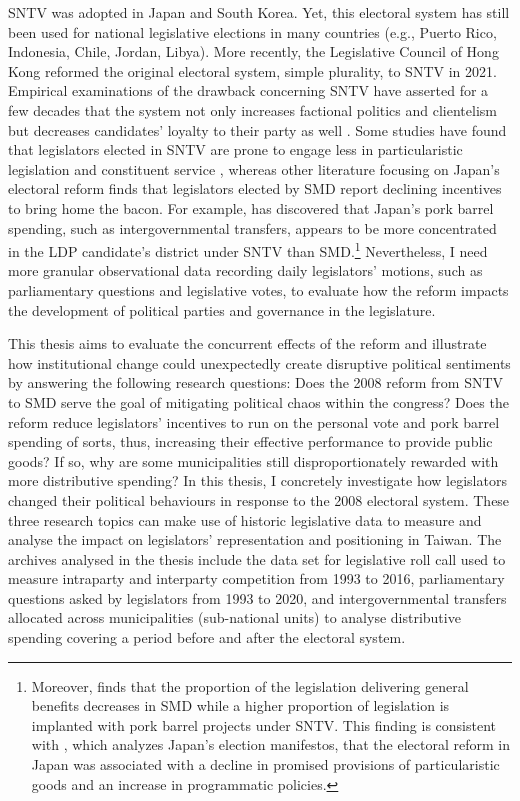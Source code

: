 SNTV was adopted in Japan and South Korea. Yet, this electoral system has still been used for national legislative elections in many countries (e.g., Puerto Rico, Indonesia, Chile, Jordan, Libya). More recently, the Legislative Council of Hong Kong reformed the original electoral system, simple plurality, to SNTV in 2021. Empirical examinations of the drawback concerning SNTV have asserted for a few decades that the system not only increases factional politics and clientelism \citep[e.g.][]{Chang2007, Wu2003} but decreases candidates' loyalty to their party as well \citep[][]{Reed2003, Herron2018, Hsu2004, Nathan1993}. Some studies have found that legislators elected in SNTV are prone to engage less in particularistic legislation \citep[e.g.,][]{Lancaster1986, Crisp2004b, Kerevel2015, Rogowski2017} and constituent service \citep[e.g.,][]{Heitshusen2005}, whereas other literature focusing on Japan's electoral reform finds that legislators elected by SMD report declining incentives to bring home the bacon. For example, \citet{Hirano2006} has discovered that Japan's pork barrel spending, such as intergovernmental transfers, appears to be more concentrated in the LDP candidate's district under SNTV than SMD.\footnote{Moreover, \citet[][]{Sheng2014} finds that the proportion of the legislation delivering general benefits decreases in SMD while a higher proportion of legislation is implanted with pork barrel projects under SNTV. This finding is consistent with \citet{Catalinac2016}, which analyzes Japan's election manifestos, that the electoral reform in Japan was associated with a decline in promised provisions of particularistic goods and an increase in programmatic policies.} Nevertheless, I need more granular observational data recording daily legislators' motions, such as parliamentary questions and legislative votes, to evaluate how the reform impacts the development of political parties and governance in the legislature. 

This thesis aims to evaluate the concurrent effects of the reform and illustrate how institutional change could unexpectedly create disruptive political sentiments by answering the following research questions: Does the 2008 reform from SNTV to SMD serve the goal of mitigating political chaos within the congress? Does the reform reduce legislators' incentives to run on the personal vote and pork barrel spending of sorts, thus, increasing their effective performance to provide public goods? If so, why are some municipalities still disproportionately rewarded with more distributive spending? In this thesis, I concretely investigate how legislators changed their political behaviours in response to the 2008 electoral system. These three research topics can make use of historic legislative data to measure and analyse the impact on legislators' representation and positioning in Taiwan. The archives analysed in the thesis include the data set for legislative roll call used to measure intraparty and interparty competition from 1993 to 2016, parliamentary questions asked by legislators from 1993 to 2020, and intergovernmental transfers allocated across municipalities (sub-national units) to analyse distributive spending covering a period before and after the electoral system.


